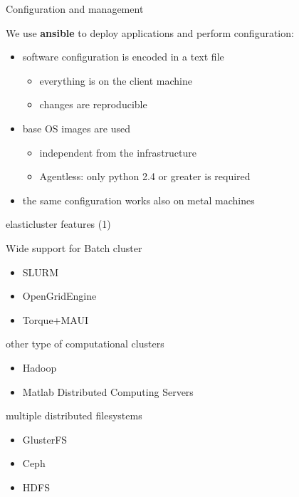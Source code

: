 \documentclass[english,serif,mathserif,usenames,dvipsnames]{beamer}
\begin{document}
\begin{frame}
  {Configuration and management}

  We use \textbf{ansible} to deploy applications and perform
  configuration:
  \begin{itemize}
  \item software configuration is encoded in a text file
    \begin{itemize}
    \item everything is on the {\color{Blue}client} machine
    \item changes are {\color{Blue}reproducible} 
    \end{itemize}
  \item base OS images are used
    \begin{itemize}
    \item {\color{Blue}independent} from the infrastructure
    \item {\color{Blue}Agentless}: only python 2.4 or greater is required
    \end{itemize}
  \item the same configuration works also on {\color{Blue}metal} machines
  \end{itemize}

\end{frame}

\begin{frame}
  {elasticluster features (1)}

  \begin{block}{Wide support for Batch cluster}
      \begin{itemize}
      \item SLURM
      \item OpenGridEngine
      \item Torque+MAUI
      \end{itemize}
  \end{block}
      
  \begin{block}{other type of computational clusters}
    \begin{itemize}
    \item Hadoop
    \item Matlab Distributed Computing Servers
    \end{itemize}
  \end{block}

  \pause
  \begin{block}{multiple distributed filesystems}
    \begin{itemize}
    \item GlusterFS
    \item Ceph
    \item HDFS
    \end{itemize}
  \end{block}
\end{frame}
\end{document}
